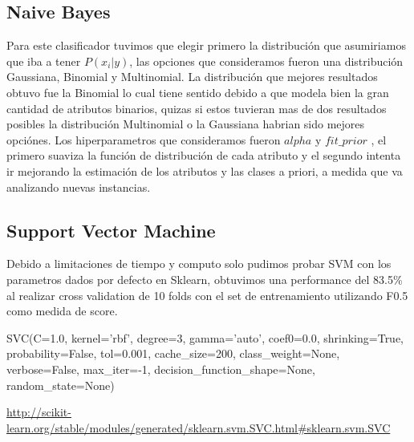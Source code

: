 \begin{enumerate}
\subsection{Naive Bayes}

Para este clasificador tuvimos que elegir primero la distribución que asumiriamos que iba a tener $ P(x_i | y) $, las opciones que consideramos fueron una distribución Gaussiana, Binomial y Multinomial. La distribución que mejores resultados obtuvo fue la Binomial lo cual tiene sentido debido a que modela bien la gran cantidad de atributos binarios, quizas si estos tuvieran mas de dos resultados posibles la distribución Multinomial o la Gaussiana habrian sido mejores opciónes.
Los hiperparametros que consideramos fueron $alpha$ y $fit\_prior$ , el primero suaviza la función de distribución de cada atributo y el segundo intenta ir mejorando la estimación de los atributos y las clases a priori, a medida que va analizando nuevas instancias.

\subsection{Support Vector Machine}

Debido a limitaciones de tiempo y computo solo pudimos probar SVM con los parametros dados por defecto en Sklearn, obtuvimos una performance del 83.5\% al realizar cross validation de 10 folds con el set de entrenamiento utilizando F0.5 como medida de score.

SVC(C=1.0, kernel='rbf', degree=3, gamma='auto', coef0=0.0, shrinking=True, probability=False, tol=0.001, cache_size=200, class_weight=None, verbose=False, max_iter=-1, decision_function_shape=None, random_state=None)

\url{http://scikit-learn.org/stable/modules/generated/sklearn.svm.SVC.html#sklearn.svm.SVC}

\end{enumerate}
